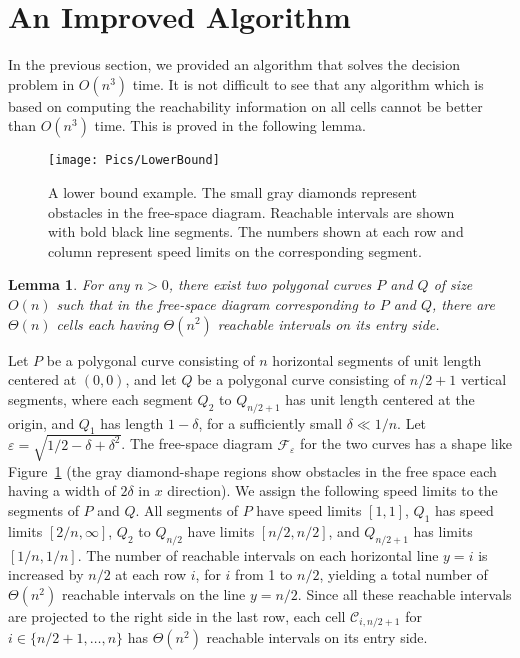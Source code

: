\documentclass[12pt]{dalthesis}
\def\favoritefont{\bfseries \sffamily}
\def\QED{\ensuremath{{\Box}}}
\def\markatright#1{\leavevmode\unskip\nobreak\quad\hspace*{\fill}{#1}}
\newenvironment{proof}
	{\begin{trivlist}\item[\hskip\labelsep{\favoritefont Proof:}]}
	{\markatright{\QED}\end{trivlist}}
\newtheorem{lemma}[theorem]{Lemma}
\newcommand{\set}[1]{{\{ #1 \}}}
\newcommand{\eps}{\varepsilon}
\newcommand{\CF}{{\mathscr F}}
\newcommand{\CC}{{\mathscr C}}
\newcommand{\cell}[1]{{\CC_{#1}}}
\newcommand{\Feps}{\CF_\eps}
\begin{document}
\section{An Improved Algorithm} \label{sec:improvedSpeed}

In the previous section,
we provided an algorithm that solves the decision problem in $O(n^3)$ time.
It is not difficult to see that any algorithm which is based on computing the reachability information on
all cells cannot be better than $O(n^3)$ time.
This is proved in the following lemma.


\begin{figure}[t]
	\centering
	\texttt{[image: Pics/LowerBound]}  
	\caption{ A lower bound example.
	The small gray diamonds represent obstacles in the free-space diagram.
	Reachable intervals are shown with bold black line segments.
	The numbers shown at each row and column represent speed limits on the corresponding segment.} 
	\label{fig:lowerbd}
\end{figure}

\begin{lemma} \label{lem:lowerbd}
	For any $n>0$, there exist two polygonal curves $P$ and $Q$ of size $O(n)$ such that in the  free-space diagram corresponding to $P$ and $Q$, 
	there are $\Theta(n)$ cells each having $\Theta(n^2)$ reachable intervals on its entry side.
\end{lemma}

\begin{proof}
	Let $P$ be a polygonal curve consisting of $n$ horizontal segments of unit length
	centered at $(0,0)$,
	and let $Q$ be a polygonal curve consisting of $n/2+1$ vertical segments, 
	where each segment $Q_{2}$ to $Q_{n/2+1}$ has unit length centered at the origin,
	and $Q_1$ has length $1-{\delta}$, for a sufficiently small $\delta \ll 1/n$.
	Let $\eps = \sqrt{1/2- \delta+ \delta^2}$.
	The free-space diagram $\Feps$ for the two curves has a shape like 
	Figure~\ref{fig:lowerbd} (the gray diamond-shape regions show obstacles in the free space
	each having a width of $2\delta$ in $x$ direction).
	We assign the following speed limits to the segments of $P$ and $Q$.
	All segments of $P$ have speed limits $[1,1]$, 
	$Q_1$ has speed limits $[2/n, \infty]$, $Q_2$ to $Q_{n/2}$ have limits $[n/2, n/2]$, and
	$Q_{n/2+1}$ has limits $[1/n,1/n]$.
The number of reachable intervals on each horizontal line $y=i$ is increased by $n/2$ 
	at each row $i$, for $i$ from 1 to $n/2$, 
	yielding a total number of $\Theta(n^2)$ reachable intervals on the line $y=n/2$.
	Since all these reachable intervals are projected to the right side in the last row, 
	each cell $\cell{i,n/2+1}$ for $i \in \set{n/2+1, \ldots, n}$ has $\Theta(n^2)$ 
	reachable intervals on its entry side.
\end{proof}
\end{document}
